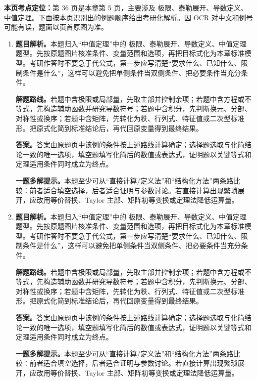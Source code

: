 \begin{solutionblock}
\textbf{本页考点定位：}第 36 页是本章第 5 页，主要涉及 极限、泰勒展开、导数定义、中值定理。下面按本页识别出的例题顺序给出考研化解析。因 OCR 对中文和例号可能有误，题面以页首原图为准。

\begin{enumerate}[label=\textbf{例\arabic*.}, leftmargin=2.4em]

\item \textbf{题目解析。}本题归入“中值定理”中的 极限、泰勒展开、导数定义、中值定理 题型。先按原题图片核准条件、变量范围和选项，再把目标式化为本章标准模型。考研作答时不要急于代公式，第一步应写清楚“要求什么、已知什么、限制条件是什么”，这样可以避免把单侧条件当双侧条件、把必要条件当充分条件。

\textbf{解题路线。}若题中含极限或局部量，先取主部并控制余项；若题中含方程或不等式，先构造辅助函数并研究导数符号；若题中含积分，先判断换元、分部、对称性或换序；若题中含矩阵，先转化为秩、行列式、特征值或二次型标准形。把原式化简到标准结论后，再代回原变量得到最终结果。

\textbf{答案。}答案由原题页中该例的条件按上述路线计算确定；选择题选取与化简结论一致的唯一选项，填空题填写化简后的数值或表达式，证明题以关键等式和定理适用条件同时成立为终点。

\textbf{一题多解提示。}本题至少可从“直接计算/定义法”和“结构化方法”两条路比较：前者适合填空选择，后者适合证明与参数讨论。若直接计算出现繁琐展开，应改用等价替换、Taylor 主部、矩阵初等变换或定理法降低运算量。

\item \textbf{题目解析。}本题归入“中值定理”中的 极限、泰勒展开、导数定义、中值定理 题型。先按原题图片核准条件、变量范围和选项，再把目标式化为本章标准模型。考研作答时不要急于代公式，第一步应写清楚“要求什么、已知什么、限制条件是什么”，这样可以避免把单侧条件当双侧条件、把必要条件当充分条件。

\textbf{解题路线。}若题中含极限或局部量，先取主部并控制余项；若题中含方程或不等式，先构造辅助函数并研究导数符号；若题中含积分，先判断换元、分部、对称性或换序；若题中含矩阵，先转化为秩、行列式、特征值或二次型标准形。把原式化简到标准结论后，再代回原变量得到最终结果。

\textbf{答案。}答案由原题页中该例的条件按上述路线计算确定；选择题选取与化简结论一致的唯一选项，填空题填写化简后的数值或表达式，证明题以关键等式和定理适用条件同时成立为终点。

\textbf{一题多解提示。}本题至少可从“直接计算/定义法”和“结构化方法”两条路比较：前者适合填空选择，后者适合证明与参数讨论。若直接计算出现繁琐展开，应改用等价替换、Taylor 主部、矩阵初等变换或定理法降低运算量。


\end{enumerate}
\end{solutionblock}
